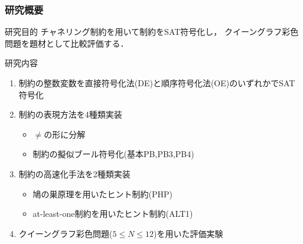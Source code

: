 \documentclass [dvipdfmx,11pt]{beamer}
\begin{document}
\begin{frame}
    \frametitle{研究概要}
    \begin{alertblock}{研究目的}
        チャネリング制約を用いて{\alldiff}制約をSAT符号化し，
        クイーングラフ彩色問題を題材として比較評価する．
    \end{alertblock}
    \begin{block}{研究内容}
        \begin{enumerate}
            \item {\alldiff}制約の整数変数を直接符号化法(DE)と順序符号化法(OE)のいずれかでSAT符号化
            \item {\alldiff}制約の表現方法を4種類実装
                \begin{itemize}
                    \item $\neq$の形に分解
                    \item {\alldiff}制約の擬似ブール符号化(基本PB,PB3,PB4)
                \end{itemize}
            \item {\alldiff}制約の高速化手法を2種類実装
                \begin{itemize}
                    \item 鳩の巣原理を用いたヒント制約(PHP)
                    \item at-least-one制約を用いたヒント制約(ALT1)
                \end{itemize}
            \item クイーングラフ彩色問題($5\leq N \leq 12$)を用いた評価実験
        \end{enumerate}
    \end{block}
\end{frame}
\end{document}
